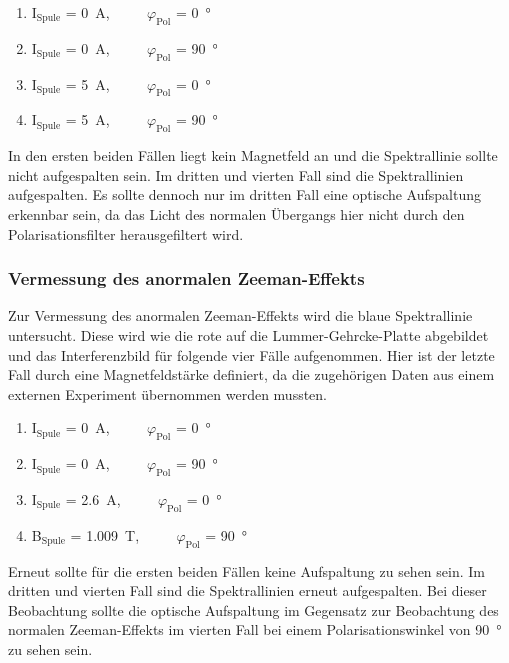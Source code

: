             \begin{enumerate}
                \item I$_{\text{Spule}}$ = \SI{0}{\ampere}, $\qquad$    $\varphi_{\text{Pol}}$ = \SI{0}{\degree}
                \item I$_{\text{Spule}}$ = \SI{0}{\ampere}, $\qquad$    $\varphi_{\text{Pol}}$ = \SI{90}{\degree}
                \item I$_{\text{Spule}}$ = \SI{5}{\ampere}, $\qquad$    $\varphi_{\text{Pol}}$ = \SI{0}{\degree}
                \item I$_{\text{Spule}}$ = \SI{5}{\ampere}, $\qquad$    $\varphi_{\text{Pol}}$ = \SI{90}{\degree}
            \end{enumerate}

            In den ersten beiden Fällen liegt kein Magnetfeld an und die Spektrallinie sollte nicht aufgespalten sein. Im dritten und vierten Fall sind die Spektrallinien aufgespalten. Es sollte dennoch nur 
            im dritten Fall eine optische Aufspaltung erkennbar sein, da das Licht des normalen Übergangs hier nicht durch den Polarisationsfilter herausgefiltert wird.
            
            
        \subsubsection*{Vermessung des anormalen Zeeman-Effekts}
            Zur Vermessung des anormalen Zeeman-Effekts wird die blaue Spektrallinie untersucht. Diese wird wie die rote auf die Lummer-Gehrcke-Platte abgebildet und das Interferenzbild für folgende vier Fälle 
            aufgenommen. Hier ist der letzte Fall durch eine Magnetfeldstärke definiert, da die zugehörigen Daten aus einem externen Experiment übernommen werden mussten.
            
            \begin{enumerate}
                \item I$_{\text{Spule}}$ = \SI{0}{\ampere}, $\qquad$    $\varphi_{\text{Pol}}$ = \SI{0}{\degree}
                \item I$_{\text{Spule}}$ = \SI{0}{\ampere}, $\qquad$    $\varphi_{\text{Pol}}$ = \SI{90}{\degree}
                \item I$_{\text{Spule}}$ = \SI{2.6}{\ampere}, $\qquad$    $\varphi_{\text{Pol}}$ = \SI{0}{\degree}
                \item B$_{\text{Spule}}$ = \SI{1.009}{\tesla}, $\qquad$    $\varphi_{\text{Pol}}$ = \SI{90}{\degree}
            \end{enumerate}

            Erneut sollte für die ersten beiden Fällen keine Aufspaltung zu sehen sein. Im dritten und vierten Fall sind die Spektrallinien erneut aufgespalten. Bei dieser Beobachtung sollte die optische 
            Aufspaltung im Gegensatz zur Beobachtung des normalen Zeeman-Effekts im vierten Fall bei einem Polarisationswinkel von \SI{90}{\degree} zu sehen sein.
        
